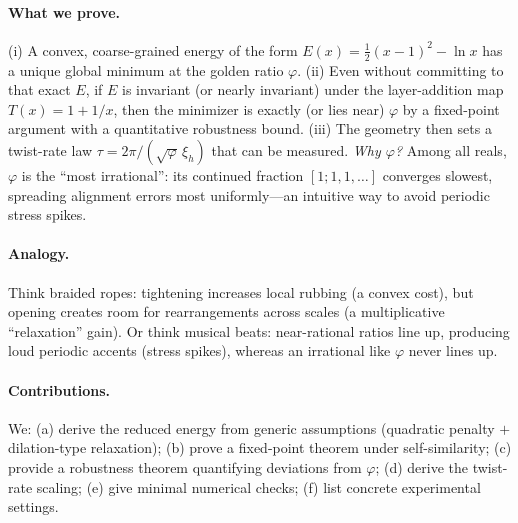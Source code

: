 \documentclass[11pt]{article}
\theoremstyle{remark}
\theoremstyle{definition}
\newcommand{\ph}{\varphi}
\begin{document}
\paragraph{What we prove.} (i) A convex, coarse-grained energy of the form $E(x)=\tfrac12(x-1)^2-\ln x$ has a unique global minimum at the golden ratio $\ph$. (ii) Even without committing to that exact $E$, if $E$ is invariant (or nearly invariant) under the layer-addition map $T(x)=1+1/x$, then the minimizer is exactly (or lies near) $\ph$ by a fixed-point argument with a quantitative robustness bound. (iii) The geometry then sets a twist-rate law $\tau=2\pi/(\sqrt{\ph}\,\xi_h)$ that can be measured. \emph{Why $\ph$?} Among all reals, $\ph$ is the ``most irrational'': its continued fraction $[1;1,1,\ldots]$ converges slowest, spreading alignment errors most uniformly---an intuitive way to avoid periodic stress spikes.

\paragraph{Analogy.} Think braided ropes: tightening increases local rubbing (a convex cost), but opening creates room for rearrangements across scales (a multiplicative ``relaxation'' gain). Or think musical beats: near-rational ratios line up, producing loud periodic accents (stress spikes), whereas an irrational like $\ph$ never lines up.

\paragraph{Contributions.} We: (a) derive the reduced energy from generic assumptions (quadratic penalty $+$ dilation-type relaxation); (b) prove a fixed-point theorem under self-similarity; (c) provide a robustness theorem quantifying deviations from $\ph$; (d) derive the twist-rate scaling; (e) give minimal numerical checks; (f) list concrete experimental settings.
\end{document}

